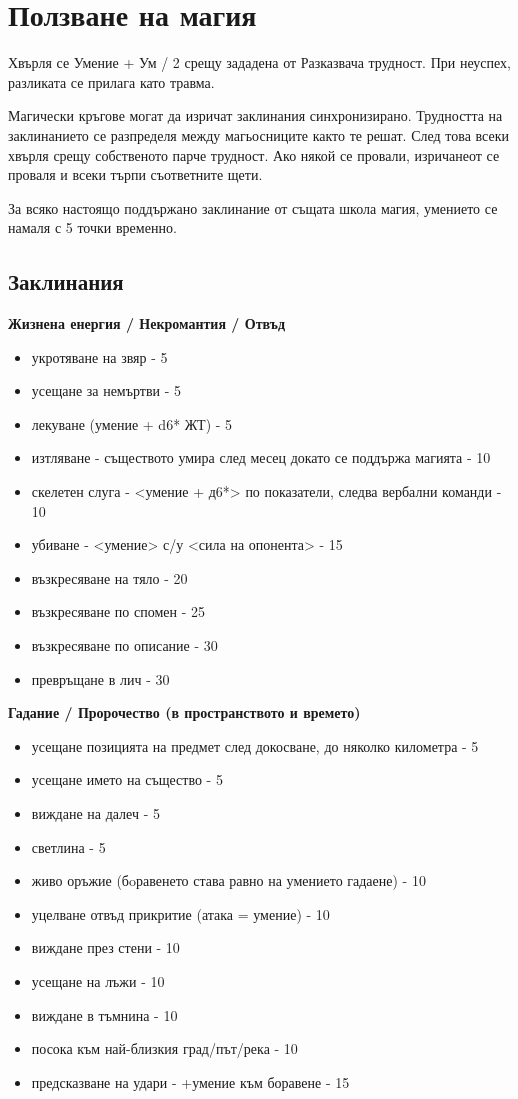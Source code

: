 \section{Ползване на магия}
Хвърля се Умение + Ум / 2 срещу зададена от Разказвача трудност. При
неуспех, разликата се прилага като травма.

Магически кръгове могат да изричат заклинания синхронизирано. Трудността
на заклинанието се разпределя между магьосниците както те решат. След това
всеки хвърля срещу собственото парче трудност. Ако някой се провали,
изричанеот се проваля и всеки търпи съответните щети.

За всяко настоящо поддържано заклинание от същата школа магия, умението се
намаля с 5 точки временно.

\subsection{Заклинания}

\textbf{Жизнена енергия / Некромантия / Отвъд}
\begin{itemize}
  \item{укротяване на звяр - 5}
  \item{усещане за немъртви - 5}
  \item{лекуване (умение + d6* ЖТ) - 5}
  \item{изтляване - съществото умира след месец  докато се поддържа магията - 10}
  \item{скелетен слуга - <умение + д6*> по показатели, следва вербални команди - 10}
  \item{убиване - <умение> с/у <сила на опонента> - 15}
  \item{възкресяване на тяло - 20}
  \item{възкресяване по спомен - 25}
  \item{възкресяване по описание - 30}
  \item{превръщане в лич - 30}
\end{itemize}

\vspace{1cm}
\textbf{Гадание / Пророчество (в пространството и времето)}
\begin{itemize}
  \item{усещане позицията на предмет след докосване, до няколко километра - 5}
  \item{усещане името на същество - 5}
  \item{виждане на далеч - 5}
  \item{светлина - 5}
  \item{живо оръжие (бoравенето става равно на умението гадаене) - 10}
  \item{уцелване отвъд прикритие (атака = умение) - 10}
  \item{виждане през стени - 10}
  \item{усещане на лъжи - 10}
  \item{виждане в тъмнина - 10}
  \item{посока към най-близкия град/път/река - 10}
  \item{предсказване на удари - +умение към боравене - 15}
\end{itemize}


